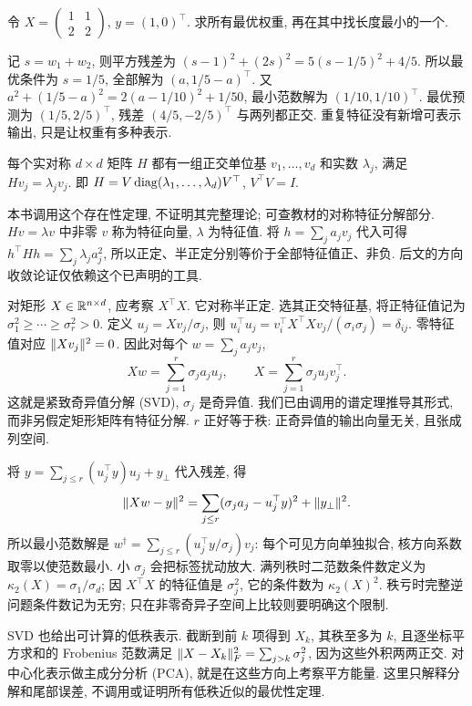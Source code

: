 \begin{example}
令 $X=\begin{pmatrix}1&1\\2&2\end{pmatrix}$, $y=(1,0)^\top$. 求所有最优权重, 再在其中找长度最小的一个.
\end{example}
\begin{solution}
记 $s=w_1+w_2$, 则平方残差为 $(s-1)^2+(2s)^2=5(s-1/5)^2+4/5$. 所以最优条件为 $s=1/5$, 全部解为 $(a,1/5-a)^\top$. 又
$a^2+(1/5-a)^2=2(a-1/10)^2+1/50$, 最小范数解为 $(1/10,1/10)^\top$. 最优预测为 $(1/5,2/5)^\top$, 残差 $(4/5,-2/5)^\top$ 与两列都正交. 重复特征没有新增可表示输出, 只是让权重有多种表示.
\end{solution}

\begin{theorem}[本章调用的实对称谱定理]\label{thm:spectral}
每个实对称 $d\times d$ 矩阵 $H$ 都有一组正交单位基 $v_1,\ldots,v_d$ 和实数 $\lambda_j$, 满足 $Hv_j=\lambda_jv_j$. 即 $H=V\operatorname{diag}(\lambda_1,\ldots,\lambda_d)V^\top$, $V^\top V=I$.
\end{theorem}
本书调用这个存在性定理, 不证明其完整理论; 可查教材的对称特征分解部分\cite{dl}. $Hv=\lambda v$ 中非零 $v$ 称为特征向量, $\lambda$ 为特征值. 将 $h=\sum_ja_jv_j$ 代入可得 $h^\top Hh=\sum_j\lambda_ja_j^2$, 所以正定、半正定分别等价于全部特征值正、非负. 后文的方向收敛论证仅依赖这个已声明的工具.

对矩形 $X\in\mathbb R^{n\times d}$, 应考察 $X^\top X$. 它对称半正定. 选其正交特征基, 将正特征值记为 $\sigma_1^2\ge\cdots\ge\sigma_r^2>0$. 定义 $u_j=Xv_j/\sigma_j$, 则
$u_i^\top u_j=v_i^\top X^\top Xv_j/(\sigma_i\sigma_j)=\delta_{ij}$.
零特征值对应 $\lVert Xv_j\rVert^2=0$. 因此对每个 $w=\sum_ja_jv_j$,
\[
Xw=\sum_{j=1}^r\sigma_ja_ju_j,
\qquad X=\sum_{j=1}^r\sigma_ju_jv_j^\top.
\]
这就是紧致奇异值分解 (SVD), $\sigma_j$ 是奇异值. 我们已由调用的谱定理推导其形式, 而非另假定矩形矩阵有特征分解. $r$ 正好等于秩: 正奇异值的输出向量无关, 且张成列空间.

将 $y=\sum_{j\le r}(u_j^\top y)u_j+y_\perp$ 代入残差, 得
\[
\lVert Xw-y\rVert^2=\sum_{j\le r}(\sigma_ja_j-u_j^\top y)^2+\lVert y_\perp\rVert^2.
\]
所以最小范数解是 $w^\dagger=\sum_{j\le r}(u_j^\top y/\sigma_j)v_j$: 每个可见方向单独拟合, 核方向系数取零以使范数最小. 小 $\sigma_j$ 会把标签扰动放大. 满列秩时二范数条件数定义为 $\kappa_2(X)=\sigma_1/\sigma_d$; 因 $X^\top X$ 的特征值是 $\sigma_j^2$, 它的条件数为 $\kappa_2(X)^2$. 秩亏时完整逆问题条件数记为无穷; 只在非零奇异子空间上比较则要明确这个限制.

SVD 也给出可计算的低秩表示. 截断到前 $k$ 项得到 $X_k$, 其秩至多为 $k$, 且逐坐标平方求和的 Frobenius 范数满足 $\lVert X-X_k\rVert_F^2=\sum_{j>k}\sigma_j^2$, 因为这些外积两两正交. 对中心化表示做主成分分析 (PCA), 就是在这些方向上考察平方能量. 这里只解释分解和尾部误差, 不调用或证明所有低秩近似的最优性定理.

